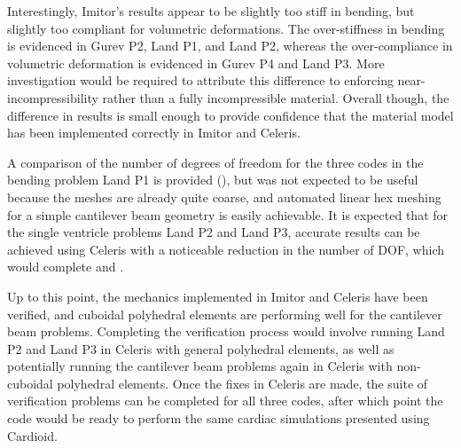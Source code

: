 Interestingly, Imitor's results appear to be slightly too stiff in bending, but slightly too compliant for volumetric deformations. The over-stiffness in bending is evidenced in Gurev P2, Land P1, and Land P2, whereas the over-compliance in volumetric deformation is evidenced in Gurev P4 and Land P3. More investigation would be required to attribute this difference to enforcing near-incompressibility rather than a fully incompressible material. Overall though, the difference in results is small enough to provide confidence that the material model has been implemented correctly in Imitor and Celeris.

A comparison of the number of degrees of freedom for the three codes in the bending problem Land P1 is provided (), but was not expected to be useful because the meshes are already quite coarse, and automated linear hex meshing for a simple cantilever beam geometry is easily achievable. It is expected that for the single ventricle problems Land P2 and Land P3, accurate results can be achieved using Celeris with a noticeable reduction in the number of DOF, which would complete  and .

Up to this point, the mechanics implemented in Imitor and Celeris have been verified, and cuboidal polyhedral elements are performing well for the cantilever beam problems. Completing the verification process would involve running Land P2 and Land P3 in Celeris with general polyhedral elements, as well as potentially running the cantilever beam problems again in Celeris with non-cuboidal polyhedral elements. Once the fixes in Celeris are made, the suite of verification problems can be completed for all three codes, after which point the code would be ready to perform the same cardiac simulations presented using Cardioid.


